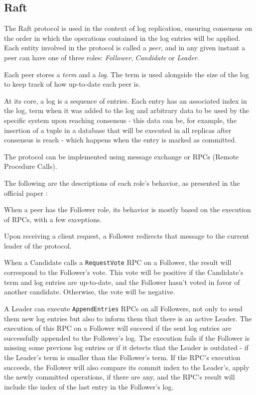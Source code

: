 \subsection{Raft}

The Raft protocol \cite{raft} is used in the context of log replication, ensuring consensus on the order in which the operations contained in the log entries will be applied. Each entity involved in the protocol is called a \textit{peer}, and in any given instant a peer can have one of three roles: \textit{Follower}, \textit{Candidate} or \textit{Leader}.

Each peer stores a \textit{term} and a \textit{log}. The term is used alongside the size of the log to keep track of how up-to-date each peer is.

At its core, a log is a sequence of entries. Each entry has an associated index in the log, term when it was added to the log and arbitrary data to be used by the specific system upon reaching consensus - this data can be, for example, the insertion of a tuple in a database that will be executed in all replicas after consensus is reach - which happens when the entry is marked as committed.


The protocol can be implemented using message exchange or RPCs (Remote Procedure Calls). 

The following are the descriptions of each role’s behavior, as presented in the official paper \cite{raft}:

When a peer has the Follower role, its behavior is mostly based on the execution of RPCs, with a few exceptions.

Upon receiving a client request, a Follower redirects that message to the current leader of the protocol.

When a Candidate calls a \texttt{RequestVote} RPC on a Follower, the result will correspond to the Follower’s vote. This vote will be positive if the Candidate’s term and log entries are up-to-date, and the Follower hasn’t voted in favor of another candidate. Otherwise, the vote will be negative.

A Leader can execute \texttt{AppendEntries} RPCs on all Followers, not only to send them new log entries but also to inform them that there is an active Leader. The execution of this RPC on a Follower will succeed if the sent log entries are successfully appended to the Follower’s log. The execution fails if the Follower is missing some previous log entries or if it detects that the Leader is outdated - if the Leader’s term is smaller than the Follower’s term. If the RPC’s execution succeeds, the Follower will also compare its commit index to the Leader’s, apply the newly committed operations, if there are any, and the RPC’s result will include the index of the last entry in the Follower’s log.


